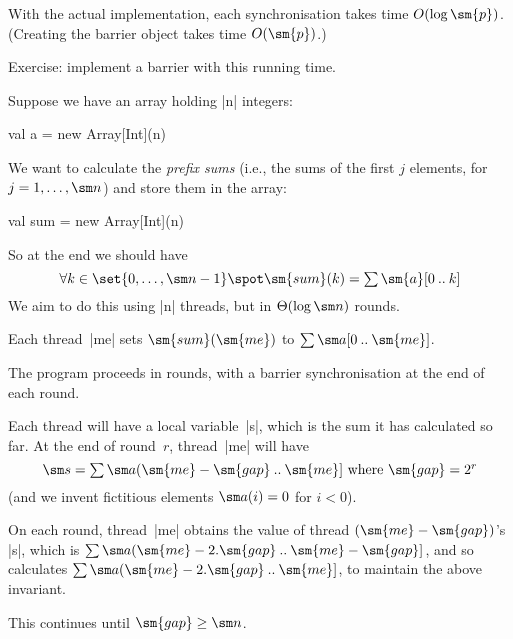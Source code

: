 
\begin{slide}

With the actual implementation, each synchronisation takes time $O(\log
\sm{p})$.  (Creating the barrier object takes time $O(\sm{p})$.)

Exercise: implement a barrier with this running time.
\end{slide}


\begin{slide}

Suppose we have an array holding |n| integers:
\begin{scala}
val a = new Array[Int](n)
\end{scala}
%
We want to calculate the \emph{prefix sums} (i.e., the sums of the first $j$
elements, for $j = 1, \ldots, \sm n$) and store them in the array:
%
\begin{scala}
val sum = new Array[Int](n)
\end{scala}
%
So at the end we should have
\[
\forall k \in \set{0, \ldots, \sm n-1} \spot 
  \sm{sum}(k) = \textstyle\sum \sm{a}[0 \upto k] 
\]
We aim to do this using |n| threads, but in $\Theta(\log \sm n)$ rounds. 
\end{slide}


\begin{slide}

Each thread~|me| sets $\sm{sum}(\sm{me})$ to $\sum \sm a[0 \upto \sm{me}]$.

The program proceeds in rounds, with a barrier synchronisation at the end of
each round.

Each thread will have a local variable~|s|, which is the sum it has
calculated so far.  At the end of round~$r$, thread~|me| will have 
\[
\sm s = \textstyle\sum \sm a(\sm{me}-\sm{gap} \upto \sm{me}]
   \mbox{ where } \sm{gap} = 2^r
\]
(and we invent fictitious elements $\sm a(i)=0$ for $i<0$).

On each round, thread~|me| obtains the value of thread
$(\sm{me}-\sm{gap})$'s |s|, which is
$\sum \sm a(\sm{me}-2.\sm{gap} \upto \sm{me}-\sm{gap}]$, and so calculates
$\sum \sm a(\sm{me}-2.\sm{gap} \upto \sm{me}]$, to maintain the above
invariant.

This continues until $\sm{gap} \ge \sm n$.
\end{slide}

